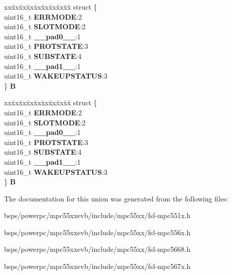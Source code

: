 \begin{DoxyCompactItemize}
\begin{tabbing}
\end{tabbing}\item 
\mbox{\label{unionuPSR0_a3aa0d305841553c57fcad9e783b3e8d0}} 
\begin{tabbing}
xx\=xx\=xx\=xx\=xx\=xx\=xx\=xx\=xx\=\kill
struct \{\\
\>uint16\_t {\bfseries ERRMODE}:2\\
\>uint16\_t {\bfseries SLOTMODE}:2\\
\>uint16\_t {\bfseries \_\_pad0\_\_}:1\\
\>uint16\_t {\bfseries PROTSTATE}:3\\
\>uint16\_t {\bfseries SUBSTATE}:4\\
\>uint16\_t {\bfseries \_\_pad1\_\_}:1\\
\>uint16\_t {\bfseries WAKEUPSTATUS}:3\\
\} {\bfseries B}\\

\end{tabbing}\item 
\mbox{\label{unionuPSR0_a06a0107f82578ce1925848f1e07859fa}} 
\begin{tabbing}
xx\=xx\=xx\=xx\=xx\=xx\=xx\=xx\=xx\=\kill
struct \{\\
\>uint16\_t {\bfseries ERRMODE}:2\\
\>uint16\_t {\bfseries SLOTMODE}:2\\
\>uint16\_t {\bfseries \_\_pad0\_\_}:1\\
\>uint16\_t {\bfseries PROTSTATE}:3\\
\>uint16\_t {\bfseries SUBSTATE}:4\\
\>uint16\_t {\bfseries \_\_pad1\_\_}:1\\
\>uint16\_t {\bfseries WAKEUPSTATUS}:3\\
\} {\bfseries B}\\

\end{tabbing}\end{DoxyCompactItemize}


The documentation for this union was generated from the following files\+:\begin{DoxyCompactItemize}
\item 
bsps/powerpc/mpc55xxevb/include/mpc55xx/fsl-\/mpc551x.\+h\item 
bsps/powerpc/mpc55xxevb/include/mpc55xx/fsl-\/mpc556x.\+h\item 
bsps/powerpc/mpc55xxevb/include/mpc55xx/fsl-\/mpc5668.\+h\item 
bsps/powerpc/mpc55xxevb/include/mpc55xx/fsl-\/mpc567x.\+h\end{DoxyCompactItemize}
